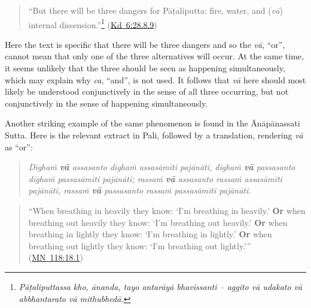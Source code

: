 \documentclass[12pt,openany]{book}%
\begin{document}
\begin{quotation}%
“But there will be three dangers for \textsanskrit{Pāṭaliputta}: fire, water, and (\textit{\textsanskrit{vā}}) internal dissension.”\footnote{\textit{\textsanskrit{Pāṭaliputtassa} kho, \textsanskrit{ānanda}, tayo \textsanskrit{antarāyā} bhavissanti – aggito \textsanskrit{vā} udakato \textsanskrit{vā} abbhantarato \textsanskrit{vā} \textsanskrit{mithubhedā}.} } (\href{https://suttacentral.net/pli-tv-kd6/en/brahmali\#28.8.9}{Kd~6:28.8.9})

%
\end{quotation}

Here the text is specific that there will be three dangers and so the \textit{\textsanskrit{vā}}, “or”, cannot mean that only one of the three alternatives will occur. At the same time, it seems unlikely that the three should be seen as happening simultaneously, which may explain why \textit{ca}, “and”, is not used. It follows that \textit{\textsanskrit{vā}} here should most likely be understood conjunctively in the sense of all three occurring, but not conjunctively in the sense of happening simultaneously.

Another striking example of the same phenomenon is found in the \textsanskrit{Ānāpānassati} Sutta. Here is the relevant extract in Pali, followed by a translation, rendering \textit{\textsanskrit{vā}} as “or”:

\begin{quotation}%
\textit{\textsanskrit{Dīghaṁ} \textbf{\textsanskrit{vā}} assasanto \textsanskrit{dīghaṁ} \textsanskrit{assasāmīti} \textsanskrit{pajānāti}, \textsanskrit{dīghaṁ} \textbf{\textsanskrit{vā}} passasanto \textsanskrit{dīghaṁ} \textsanskrit{passasāmīti} \textsanskrit{pajānāti}; \textsanskrit{rassaṁ} \textbf{\textsanskrit{vā}} assasanto \textsanskrit{rassaṁ} \textsanskrit{assasāmīti} \textsanskrit{pajānāti}, \textsanskrit{rassaṁ} \textbf{\textsanskrit{vā}} passasanto \textsanskrit{rassaṁ} \textsanskrit{passasāmīti} \textsanskrit{pajānāti}.}

%
\end{quotation}

\begin{quotation}%
“When breathing in heavily they know: ‘I’m breathing in heavily.’ \textbf{Or} when breathing out heavily they know: ‘I’m breathing out heavily.’ \textbf{Or} when breathing in lightly they know: ‘I’m breathing in lightly.’ \textbf{Or} when breathing out lightly they know: ‘I’m breathing out lightly.’” (\href{https://suttacentral.net/mn118/en/sujato\#18.1}{MN~118:18.1})

%
\end{quotation}
\end{document}
